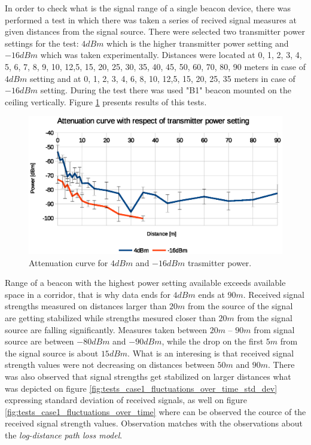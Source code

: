 \documentclass[../main.tex]{subfiles}
\begin{document}
In order to check what is the signal range of a single beacon device, there was performed a test in which there was taken a series of recived signal measures at given distances from the signal source. There were selected two transmitter power settings for the test: $4 dBm$ which is the higher transmitter power setting and $-16 dBm$ which was taken experimentally. Distances were located at 0, 1, 2, 3, 4, 5, 6, 7, 8, 9, 10, 12,5, 15, 20, 25, 30, 35, 40, 45, 50, 60, 70, 80, 90 meters in case of $4 dBm$ setting and at 0, 1, 2, 3, 4, 6, 8, 10, 12,5, 15, 20, 25, 35 meters in case of $-16 dBm$ setting. During the test there was used "B1" beacon mounted on the ceiling vertically. Figure \ref{fig:tests_case1_attenuation} presents results of this tests.

\begin{figure}[!htbp]
\includegraphics[width=\textwidth, keepaspectratio]{pictures/tests_case1_attenuation}
\centering
\caption{Attenuation curve for $4 dBm$ and $-16 dBm$ trasmitter power.}
\label{fig:tests_case1_attenuation}
\end{figure}

Range of a beacon with the highest power setting available exceeds available space in a corridor, that is why data ends for $4 dBm$ ends at $90 m$. Received signal strengths measured on distances larger than $20m$ from the source of the signal are getting stabilized while strengths mesured closer than $20m$ from the signal source are falling significantly. Measures taken between $20m$ -- $90m$ from signal source are between $-80 dBm$ and $-90 dBm$, while the drop on the first $5m$ from the signal source is about $15 dBm$. What is an interesing is that received signal strength values were not decreasing on distances between $50m$ and $90m$. There was also observed that signal strengths get stabilized on larger distances what was depicted on figure \ref{fig:tests_case1_fluctuations_over_time_std_dev} expressing standard deviation of received signals, as well on figure \ref{fig:tests_case1_fluctuations_over_time} where can be observed the cource of the received signal strength values. Observation matches with the observations about the \textit{log-distance path loss model}.
\end{document}
